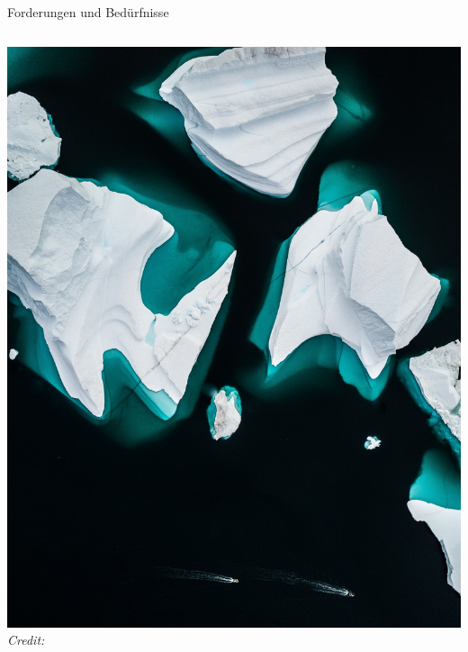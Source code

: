 \begin{frame}{Forderungen und Bedürfnisse}
\begin{columns}[c]
    \begin{column}{.35\textwidth}
      \includegraphics[width=\textwidth]{content/fig/eisberg.jpg}
      {\hspace*{15pt}\hbox{\scriptsize\itshape Credit:}}
    \end{column}
  \end{columns}

\end{frame}


